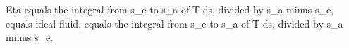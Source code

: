 Eta equals the integral from s_e to s_a of T ds, divided by s_a minus s_e, equals ideal fluid, equals the integral from s_e to s_a of T ds, divided by s_a minus s_e.